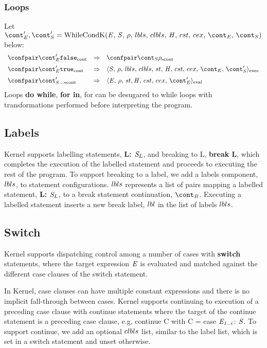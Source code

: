 \documentclass{article}
\begin{document}
\subsubsection{Loops}
Let $\econt', \scont' = \whilecondk$ below:
\[
  \begin{array}{lcl}
	\contconf{\econt'}{\false}
	& \Rightarrow &
	\scontconf{\scont}{\env}\\[2mm]

	\contconf{\econt'}{\true}
	& \Rightarrow &
	\execconf{\stmt}{\env}{\lbls}{\clbls}{\handler}{\cstrace}{\cex}{\econt}{\scont'}\\[2mm]

	\scontconf{\scont'}{\_}
	& \Rightarrow &
	\evalconf{\expr}{\env}{\strace}{\cstrace}{\cex}{\econt'}\\
  \end{array}
\]
Loops \textbf{do while}, \textbf{for in}, for can be desugared to while loops with transformations performed before interpreting the program.

\subsection{Labels}

Kernel supports labelling statements, \textbf{L: $\mathit{S}_{L}$}, and breaking to L, \textbf{break L}, which completes the execution of the labelled statement and proceeds to executing the rest of the program.
To support breaking to a label, we add a labels component, $lbls$, to statement configurations. $lbls$ represents a list of pairs mapping a labelled statement, \textbf{L: $\mathit{S}_L$}, to a break statement continuation, $\bcont$. Executing a labelled statement inserts a new break label, $lbl$ in the list of labels $lbls$.

\subsection{Switch}
Kernel supports dispatching control among a number of cases with \textbf{switch} statements, where the target expression $\mathit{E}$ is evaluated and matched against the different case clauses of the switch statement. 
 
In Kernel, case clauses can have multiple constant expressions and there is no implicit fall-through between cases. Kernel supports continuing to execution of a preceding case clause with continue statements where the target of the continue statement is a preceding case clause, e.g, continue C with C = case $\mathit{E}_\mathit{1..i}$: $\mathit{S}$. To support continue, we add an optional $clbls$ list, similar to the label list, which is set in a switch statement and unset otherwise.
\end{document}
